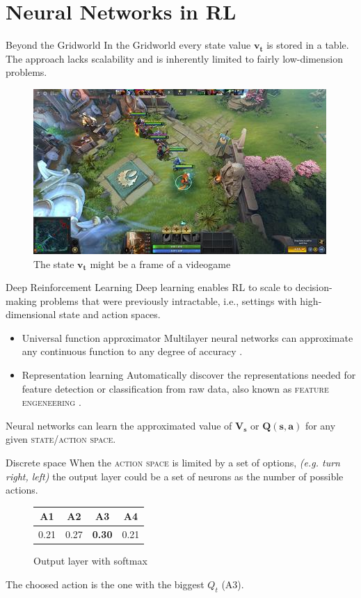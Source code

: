 \documentclass[aspectratio=169]{beamer}
\begin{document}
\section{Neural Networks in RL}
\begin{frame}{Beyond the Gridworld}
	In the Gridworld every state value $\mathbf{v_t}$ is stored in a table. 
	The approach lacks scalability and is inherently limited to fairly low-dimension problems.
	\begin{figure}
		\includegraphics[scale=0.4]{img/dota2.jpg}
		\caption{The state $\mathbf{v_t}$ might be a frame of a videogame \cite{dota2}}
	\end{figure}
\end{frame}
\begin{frame}[fragile]{Deep Reinforcement Learning}
Deep  learning  enables  RL  to  scale  to  decision-making
problems  that  were  previously  intractable,  i.e.,  settings  with
high-dimensional  state  and  action  spaces. \cite{arulkumaran2017brief}
	\begin{itemize}
		\item \alert{Universal function approximator} Multilayer neural networks can approximate any continuous function to any degree of accuracy \cite{hornik1989multilayer}.
		\pause
		\item \alert{Representation learning} Automatically discover the representations needed for feature detection or classification from raw data, also known as \textsc{feature engeneering} \cite{bengio2013representation}.
	\end{itemize}
	Neural networks can learn the approximated value of $\mathbf{V_s}$ or $\mathbf{Q(s, a)}$ for any given \textsc{state/action space}.
\end{frame}

\begin{frame}{Discrete space}
	When the \textsc{action space} is limited by a set of options, \textit{(e.g. turn right, left)} the output layer could be a set of neurons as the number of possible actions.
	\begin{figure}
		\begin{tabular}{ |c|c|c|c| } 
		 \hline
			\textbf{A1} & \textbf{A2} & \textbf{A3} & \textbf{A4}  \\ [0.5ex] 
		 \hline
		 \hline
			 0.21 & 0.27 & \textbf{0.30} & 0.21 \\ 
		 \hline
		\end{tabular}
		\caption{Output layer with softmax}
	\end{figure}
	The choosed action is the one with the biggest $Q_t$ (\textsc{A3}).
\end{frame}
\end{document}
